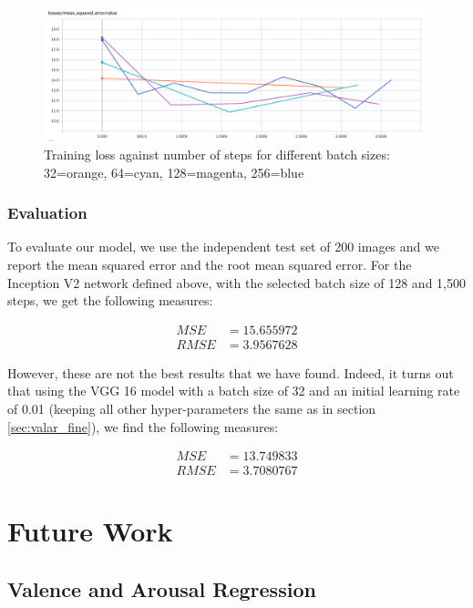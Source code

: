 \documentclass[12pt,twoside]{article}
\begin{document}
\begin{figure}[ht]
  \centering
  \includegraphics[width=1\textwidth]{figures/batch_size_valar_inception.png}
  \caption{Training loss against number of steps for different batch sizes:
  32=orange, 64=cyan, 128=magenta, 256=blue}
  \label{fig:batch_size_valar_inception}
\end{figure}


\subsubsection{Evaluation}

To evaluate our model, we use the independent test set of 200 images and we
report the mean squared error and the root mean squared error. For the
Inception V2 network defined above, with the selected batch size of 128 and
1,500 steps, we get the following measures:

\begin{align}
  MSE &= 15.655972 \\
  RMSE &= 3.9567628
\end{align}

However, these are not the best results that we have found. Indeed, it turns
out that using the VGG 16 model with a batch size of 32 and an initial learning
rate of 0.01 (keeping all other hyper-parameters the same as in section
\ref{sec:valar_fine}), we find the following measures:

\begin{align}
  MSE &= 13.749833 \\
  RMSE &= 3.7080767
\end{align}


\clearpage
\section{Future Work}


\subsection{Valence and Arousal Regression}
\end{document}
